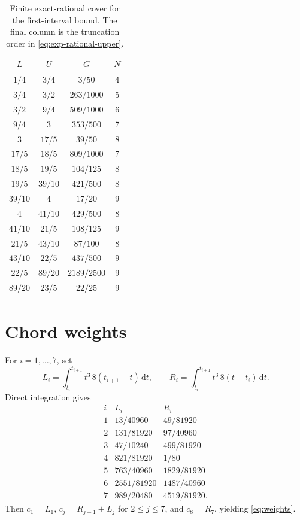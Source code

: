 \documentclass[11pt]{amsart}
\theoremstyle{definition}
\newcommand{\dd}{\,\mathrm d}
\begin{document}
\begin{table}[ht]
\centering
\small
\caption{Finite exact-rational cover for the first-interval bound.  The final column is the truncation order in \eqref{eq:exp-rational-upper}.}\label{tab:T0}
\begin{tabular}{cccc}
\toprule
$L$&$U$&$G$&$N$\\
\midrule
$1/4$&$3/4$&$3/50$&4\\
$3/4$&$3/2$&$263/1000$&5\\
$3/2$&$9/4$&$509/1000$&6\\
$9/4$&$3$&$353/500$&7\\
$3$&$17/5$&$39/50$&8\\
$17/5$&$18/5$&$809/1000$&7\\
$18/5$&$19/5$&$104/125$&8\\
$19/5$&$39/10$&$421/500$&8\\
$39/10$&$4$&$17/20$&9\\
$4$&$41/10$&$429/500$&8\\
$41/10$&$21/5$&$108/125$&9\\
$21/5$&$43/10$&$87/100$&8\\
$43/10$&$22/5$&$437/500$&9\\
$22/5$&$89/20$&$2189/2500$&9\\
$89/20$&$23/5$&$22/25$&9\\
\bottomrule
\end{tabular}
\end{table}

\section{Chord weights}\label{app:weights}

For $i=1,\ldots,7$, set
\[
 L_i=\int_{t_i}^{t_{i+1}}t^3\,8(t_{i+1}-t)\dd t,
 \qquad
 R_i=\int_{t_i}^{t_{i+1}}t^3\,8(t-t_i)\dd t.
\]
Direct integration gives
\[
\begin{array}{c|cc}
 i&L_i&R_i\\ \hline
1&13/40960&49/81920\\
2&131/81920&97/40960\\
3&47/10240&499/81920\\
4&821/81920&1/80\\
5&763/40960&1829/81920\\
6&2551/81920&1487/40960\\
7&989/20480&4519/81920.
\end{array}
\]
Then $c_1=L_1$, $c_j=R_{j-1}+L_j$ for $2\le j\le7$, and $c_8=R_7$, yielding \eqref{eq:weights}.
\end{document}
